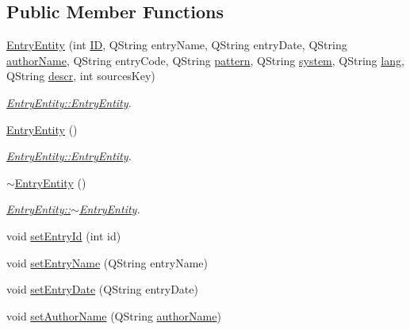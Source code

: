 \subsection*{Public Member Functions}
\begin{DoxyCompactItemize}
\item 
\hyperlink{class_entry_entity_a4131db8f9e9a5f600948f32ec92b15a1}{Entry\+Entity} (int \hyperlink{class_entry_entity_a0353f8e056e80e3277f1cc6c17d2e071}{I\+D}, Q\+String entry\+Name, Q\+String entry\+Date, Q\+String \hyperlink{class_entry_entity_abeb114f6b0cfe1678a36e998e21434bf}{author\+Name}, Q\+String entry\+Code, Q\+String \hyperlink{class_entry_entity_a65f0a241d2a05f7b2da01e5868acfe5c}{pattern}, Q\+String \hyperlink{class_entry_entity_ab925c61d96e3e82745d185e931ef1e64}{system}, Q\+String \hyperlink{class_entry_entity_a5225b37537638e119ef901cad839390c}{lang}, Q\+String \hyperlink{class_entry_entity_ae87c35927889353ff5739e1fabe499bb}{descr}, int sources\+Key)
\begin{DoxyCompactList}\small\item\em \hyperlink{class_entry_entity_a4131db8f9e9a5f600948f32ec92b15a1}{Entry\+Entity\+::\+Entry\+Entity}. \end{DoxyCompactList}\item 
\hyperlink{class_entry_entity_a961e4826d03bfa25bfffbb67bd2fb659}{Entry\+Entity} ()
\begin{DoxyCompactList}\small\item\em \hyperlink{class_entry_entity_a4131db8f9e9a5f600948f32ec92b15a1}{Entry\+Entity\+::\+Entry\+Entity}. \end{DoxyCompactList}\item 
\hyperlink{class_entry_entity_a1f6cbe666bbaea1653ece144559fea36}{$\sim$\+Entry\+Entity} ()
\begin{DoxyCompactList}\small\item\em \hyperlink{class_entry_entity_a1f6cbe666bbaea1653ece144559fea36}{Entry\+Entity\+::$\sim$\+Entry\+Entity}. \end{DoxyCompactList}\item 
void \hyperlink{class_entry_entity_a64412ce49af6eee9c1d9ff5a884f9127}{set\+Entry\+Id} (int id)
\item 
void \hyperlink{class_entry_entity_a96b5fdfb05183a9c8f570abb3c73e974}{set\+Entry\+Name} (Q\+String entry\+Name)
\item 
void \hyperlink{class_entry_entity_a20c8ff5f7b29bc6a54a68fde6318f365}{set\+Entry\+Date} (Q\+String entry\+Date)
\item 
void \hyperlink{class_entry_entity_ae99e4feb875823e643b62c0f9b0a2771}{set\+Author\+Name} (Q\+String \hyperlink{class_entry_entity_abeb114f6b0cfe1678a36e998e21434bf}{author\+Name})

\end{DoxyCompactItemize}
